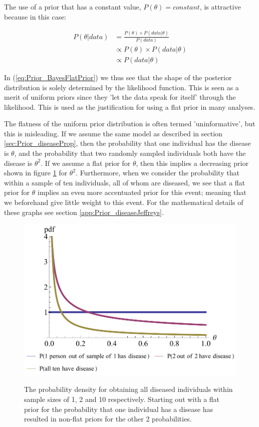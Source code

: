 \documentclass[11pt,fullpage]{book}
\begin{document}
The use of a prior that has a constant value, $P(\theta)=constant$, is attractive because in this case:

\begin{equation}
\begin{align}
P(\theta|data) &= \frac{P(\theta)\times P(data|\theta)}{P(data)}\\
& \propto P(\theta)\times P(data|\theta)\\
& \propto P(data|\theta)
\end{align}
\end{equation}\label{eq:Prior_BayesFlatPrior}

In (\ref{eq:Prior_BayesFlatPrior}) we thus see that the shape of the posterior distribution is solely determined by the likelihood function. This is seen as a merit of uniform priors since they 'let the data speak for itself' through the likelihood. This is used as the justification for using a flat prior in many analyses.

The flatness of the uniform prior distribution is often termed 'uninformative', but this is misleading. If we assume the same model as described in section \ref{sec:Prior_diseaseProp}, then the probability that one individual has the disease is $\theta$, and the probability that two randomly sampled individuals both have the disease is $\theta^2$. If we assume a flat prior for $\theta$, then this implies a decreasing prior shown in figure \ref{fig:Prior_jeffreysIntro} for $\theta^2$. Furthermore, when we consider the probability that within a sample of ten individuals, all of whom are diseased, we see that a flat prior for $\theta$ implies an even more accentuated prior for this event; meaning that we beforehand give little weight to this event. For the mathematical details of these graphs see section \ref{app:Prior_diseaseJeffreys}.

\begin{figure}
\centering
\scalebox{0.75} 
{\includegraphics{Prior_jeffreysIntro.pdf}}\caption{The probability density for obtaining all diseased individuals within sample sizes of 1, 2 and 10 respectively. Starting out with a flat prior for the probability that one individual has a disease has resulted in non-flat priors for the other 2 probabilities.}\label{fig:Prior_jeffreysIntro}
\end{figure}
\end{document}

